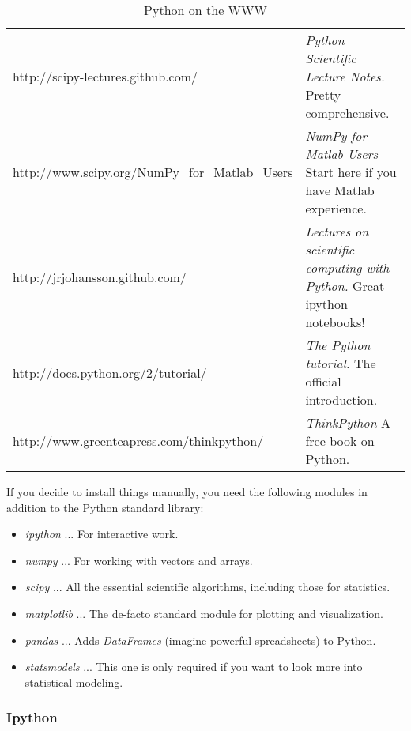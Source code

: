 \begin{table}

  \footnotesize{
  \centering
   \begin{tabular}{|l p{10 cm}|}
     \hline
     http://scipy-lectures.github.com/ & \emph{Python Scientific Lecture Notes.} Pretty comprehensive. \\     http://www.scipy.org/NumPy\_for\_Matlab\_Users & \emph{NumPy for Matlab Users} Start here if you have Matlab experience. \\
     http://jrjohansson.github.com/ & \emph{Lectures on scientific computing with Python.} Great ipython notebooks! \\     http://docs.python.org/2/tutorial/ & \emph{The Python tutorial.} The official introduction. \\
     http://www.greenteapress.com/thinkpython/ & \emph{ThinkPython} A free book on Python. \\
     \hline
   \end{tabular}
   }
  \caption{Python on the WWW}\label{table:python}
\end{table}

If you decide to install things manually, you need the following modules in addition to the Python standard library:

\begin{itemize}
  \item \emph{ipython} ... For interactive work.
  \item \emph{numpy} ... For working with vectors and arrays.
  \item \emph{scipy} ... All the essential scientific algorithms, including those for statistics.
  \item \emph{matplotlib} ... The de-facto standard module for plotting and visualization.
  \item \emph{pandas} ... Adds \emph{DataFrames} (imagine powerful spreadsheets) to Python.
  \item \emph{statsmodels} ... This one is only required if you want to look more into statistical modeling.
\end{itemize}

\subsubsection{Ipython}

